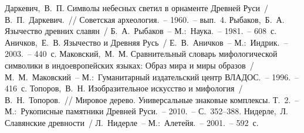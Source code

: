 \documentclass[pscyr,chapters]{hedwork}
\begin{document}
  \renewcommand{\bibname}{Список литературы}
  \begin{thebibliography}{9}
     Даркевич,~В.~П. Символы небесных светил в орнаменте Древней
      Руси~/ В.~П.~Даркевич.~// Советская археология.~-- 1960.~-- вып.~4.
     Рыбаков,~Б.~А. Язычество древних славян~/ Б.~А.~Рыбаков~--
      М.:~Наука.~-- 1981.~-- 608~с.
     Аничков,~Е.~В. Язычество и Древняя Русь~/ Е.~В.~Аничков~--
      М.:~Индрик.~-- 2003.~-- 440~с.
     Маковский,~М.~М. Сравнительный словарь мифологической символики
      в индоевропейских языках: Образ мира и миры образов~/ М.~М.~Маковский~--
      М.:~Гуманитарный издательский центр ВЛАДОС.~-- 1996.~-- 416~с.
     Топоров,~В.~Н. Изобразительное искусство и мифология~/
      В.~Н.~Топоров.~// Мировое дерево. Универсальные знаковые комплексы.
      Т.~2.~-- М.:~Рукописные памятники Древней Руси.~-- 2010.~-- С.~352--388.
     Нидерле,~Л. Славянские древности~/ Л.~Нидерле~--
      М.:~Алетейя.~-- 2001.~-- 592~с.
\end{thebibliography}
\end{document}
